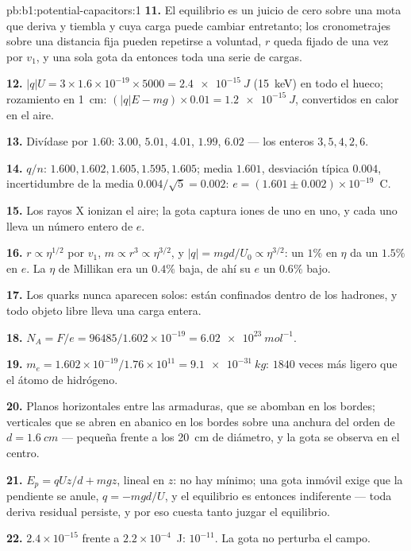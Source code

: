 \begin{solution}{pb:b1:potential-capacitors:1}
\textbf{11.} El equilibrio es un juicio de cero sobre una mota que
deriva y tiembla y cuya carga puede cambiar entretanto; los cronometrajes
sobre una distancia fija pueden repetirse a voluntad, $r$ queda fijado de
una vez por $v_1$, y una sola gota da entonces toda una serie de cargas.

\textbf{12.} $|q|U = 3 \times 1.6 \times 10^{-19} \times 5000 = \qty{2.4e-15}{J}$
(\qty{15}{keV}) en todo el hueco; rozamiento en \qty{1}{cm}: $(|q|E - mg) \times 0.01 =
\qty{1.2e-15}{J}$, convertidos en calor en el aire.

\textbf{13.} Divídase por $1.60$: $3.00$, $5.01$, $4.01$, $1.99$, $6.02$ ---
los enteros $3, 5, 4, 2, 6$.

\textbf{14.} $q/n$: $1.600, 1.602, 1.605, 1.595, 1.605$; media $1.601$,
desviación típica $0.004$, incertidumbre de la media $0.004/\sqrt5 =
0.002$: $e = (1.601 \pm 0.002) \times 10^{-19}$~C.

\textbf{15.} Los rayos X ionizan el aire; la gota captura iones de uno en
uno, y cada uno lleva un número entero de $e$.

\textbf{16.} $r \propto \eta^{1/2}$ por $v_1$, $m \propto r^3 \propto \eta^{3/2}$, y
$|q| = mgd/U_0 \propto \eta^{3/2}$: un $1\%$ en $\eta$ da un $1.5\%$ en $e$. La
$\eta$ de Millikan era un $0.4\%$ baja, de ahí su $e$ un $0.6\%$ bajo.

\textbf{17.} Los quarks nunca aparecen solos: están confinados dentro de
los hadrones, y todo objeto libre lleva una carga entera.

\textbf{18.} $N_A = F/e = 96485/1.602 \times 10^{-19} = \qty{6.02e23}{mol^{-1}}$.

\textbf{19.} $m_e = 1.602 \times 10^{-19}/1.76 \times 10^{11} = \qty{9.1e-31}{kg}$: $1840$
veces más ligero que el átomo de hidrógeno.

\textbf{20.} Planos horizontales entre las armaduras, que se abomban en
los bordes;  verticales que se abren en abanico en los
bordes sobre una anchura del orden de $d = \qty{1.6}{cm}$ --- pequeña
frente a los \qty{20}{cm} de diámetro, y la gota se observa en el centro.

\textbf{21.} $E_p = qUz/d + mgz$, lineal en $z$: no hay mínimo; una gota
inmóvil exige que la pendiente se anule, $q = -mgd/U$, y el equilibrio es
entonces indiferente --- toda deriva residual persiste, y por eso cuesta
tanto juzgar el equilibrio.

\textbf{22.} $2.4 \times 10^{-15}$ frente a $2.2 \times 10^{-4}$~J: $10^{-11}$. La gota
no perturba el campo.


\end{solution}

